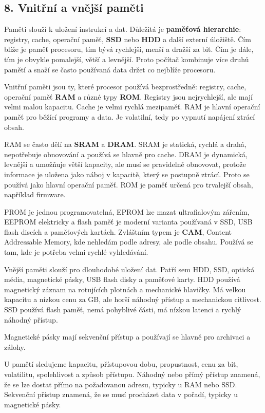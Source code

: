 \subsection*{8. Vnitřní a vnější paměti}

Paměti slouží k uložení instrukcí a dat. Důležitá je \textbf{paměťová hierarchie}: registry, cache, operační paměť, \textbf{SSD} nebo \textbf{HDD} a další externí úložiště. Čím blíže je paměť procesoru, tím bývá rychlejší, menší a dražší za bit. Čím je dále, tím je obvykle pomalejší, větší a levnější. Proto počítač kombinuje více druhů pamětí a snaží se často používaná data držet co nejblíže procesoru.

Vnitřní paměti jsou ty, které procesor používá bezprostředně: registry, cache, operační paměť \textbf{RAM} a různé typy \textbf{ROM}. Registry jsou nejrychlejší, ale mají velmi malou kapacitu. Cache je velmi rychlá mezipaměť. RAM je hlavní operační paměť pro běžící programy a data. Je volatilní, tedy po vypnutí napájení ztrácí obsah.

RAM se často dělí na \textbf{SRAM} a \textbf{DRAM}. SRAM je statická, rychlá a drahá, nepotřebuje obnovování a používá se hlavně pro cache. DRAM je dynamická, levnější a umožňuje větší kapacity, ale musí se pravidelně obnovovat, protože informace je uložena jako náboj v kapacitě, který se postupně ztrácí. Proto se používá jako hlavní operační paměť. ROM je paměť určená pro trvalejší obsah, například firmware.

PROM je jednou programovatelná, EPROM lze mazat ultrafialovým zářením, EEPROM elektricky a flash paměť je moderní varianta používaná v SSD, USB flash discích a paměťových kartách. Zvláštním typem je \textbf{CAM}, Content Addressable Memory, kde nehledám podle adresy, ale podle obsahu. Používá se tam, kde je potřeba velmi rychlé vyhledávání.

Vnější paměti slouží pro dlouhodobé uložení dat. Patří sem HDD, SSD, optická média, magnetické pásky, USB flash disky a paměťové karty. HDD používá magnetický záznam na rotujících plotnách a mechanické hlavičky. Má velkou kapacitu a nízkou cenu za GB, ale horší náhodný přístup a mechanickou citlivost. SSD používá flash paměť, nemá pohyblivé části, má nízkou latenci a rychlý náhodný přístup.

Magnetické pásky mají sekvenční přístup a používají se hlavně pro archivaci a zálohy.

U pamětí sledujeme kapacitu, přístupovou dobu, propustnost, cenu za bit, volatilitu, spolehlivost a způsob přístupu. Náhodný nebo přímý přístup znamená, že se lze dostat přímo na požadovanou adresu, typicky u RAM nebo SSD. Sekvenční přístup znamená, že se musí procházet data v pořadí, typicky u magnetické pásky.

